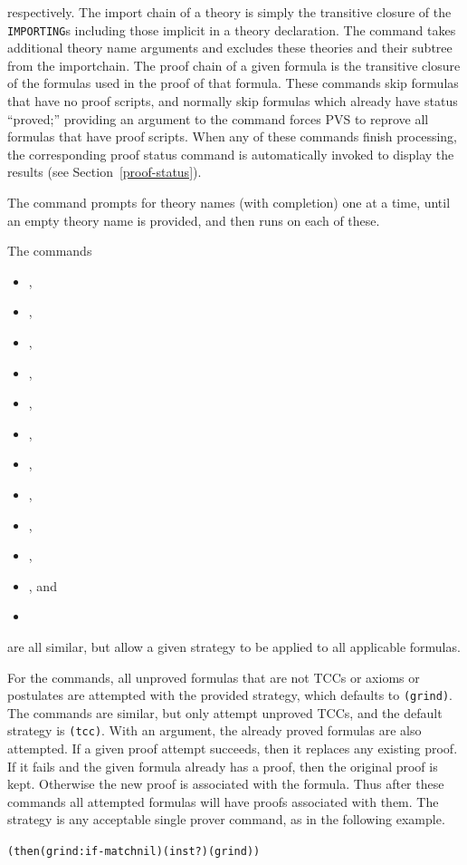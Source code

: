 respectively.  The import chain of a theory is simply the transitive
closure of the \texttt{IMPORTING}s including those implicit in a theory
declaration.  The  command takes additional
theory name arguments and excludes these theories and their subtree from
the importchain.  The proof chain of a given formula is the transitive
closure of the formulas used in the proof of that formula.  These
commands skip formulas that have no proof scripts, and normally skip
formulas which already have status ``proved;'' providing an argument to
the command forces PVS to reprove all formulas that have proof scripts.
When any of these commands finish processing, the corresponding proof
status command is automatically invoked to
display the results (see Section~\ref{proof-status}).

The  command prompts for theory names (with
completion) one at a time, until an empty theory name is provided, and
then runs  on each of these.


The commands
\begin{itemize}\setlength{\topsep}{0pt}\setlength{\parskip}{0pt}%
  \setlength{\itemsep}{0pt}\setlength{\parsep}{0pt}\renewcommand{\labelitemi}{}
\item {},
\item {},
\item {},
\item {},
\item {},
\item {},
\item {},
\item {},
\item {},
\item {},
\item {}, and
\item {}
\end{itemize}
are all similar, but allow a
given strategy to be applied to all applicable formulas.

For the  commands, all unproved formulas that are not
TCCs or axioms or postulates are attempted with the provided strategy,
which defaults to \texttt{(grind)}.  The  commands are
similar, but only attempt unproved TCCs, and the default strategy is
\texttt{(tcc)}.  With an argument, the already proved formulas are also
attempted.  If a given proof attempt succeeds, then it replaces any
existing proof.  If it fails and the given formula already has a proof,
then the original proof is kept.  Otherwise the new proof is associated
with the formula.  Thus after these commands all attempted formulas will
have proofs associated with them.  The strategy is any acceptable single
prover command, as in the following example.
\begin{alltt}
  (then (grind :if-match nil) (inst?) (grind))
\end{alltt}


